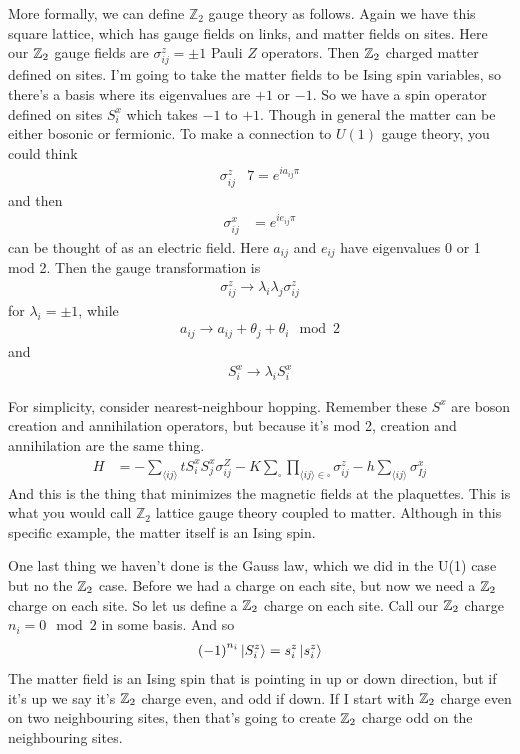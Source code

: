 More formally,
we can define $\mathbb{Z}_2$ gauge theory as follows.
Again we have this square lattice,
which has gauge fields on links,
and matter fields on sites.
Here our $\mathbb{Z}_2$ gauge fields are $\sigma_{ij}^z= \pm 1$ Pauli $Z$ operators.
Then $\mathbb{Z}_2$ charged matter defined on sites.
I'm going to take the matter fields to be Ising spin variables,
so there's a basis where its eigenvalues are $+1$ or $-1$.
So we have a spin operator defined on sites $S_{i}^{x}$
which takes $-1$ to $+1$.
Though in general the matter can be either bosonic or fermionic.
To make a connection to $U(1)$ gauge theory,
you could think
\begin{align}
    \sigma_{ij}^{z} &7=
    e^{ia_{ij}\pi}
\end{align}
and then
\begin{align}
    \sigma_{ij}^{x}
    &=
    e^{i e_{ij} \pi}
\end{align}
can be thought of as an electric field.
Here $a_{ij}$ and $e_{ij}$ have eigenvalues 0 or 1 mod 2.
Then the gauge transformation is
\begin{align}
    \sigma_{ij}^z \to \lambda_i \lambda_j \sigma_{ij}^z
\end{align}
for $\lambda_i = \pm 1$,
while
\begin{align}
    a_{ij} \to a_{ij} + \theta_j + \theta_i \mod 2
\end{align}
and 
\begin{align}
    S_i^x \to \lambda_i S_i^x
\end{align}

For simplicity,
consider nearest-neighbour hopping.
Remember these $S^x$ are boson creation and annihilation operators,
but because it's mod 2,
creation and annihilation are the same thing.
\begin{align}
    H &=
    -\sum_{\langle ij \rangle}
    t 
    S_i^x S_j^x \sigma_{ij}^Z
    - K
    \sum_{\square}
    \prod_{\langle ij\rangle \in \square}
    \sigma_{ij}^z
    - h
    \sum_{\langle ij \rangle}
    \sigma_{Ij}^x
\end{align}
And this is the thing that minimizes the magnetic fields at the plaquettes.
This is what you would call $\mathbb{Z}_2$ lattice gauge theory
coupled to matter.
Although in this specific example,
the matter itself is an Ising spin.

One last thing we haven't done is the Gauss law,
which we did in the U(1) case but no the $\mathbb{Z}_2$ case.
Before we had a charge on each site,
but now we need a $\mathbb{Z}_2$ charge on each site.
So let us define a $\mathbb{Z}_2$ charge on each site.
Call our $\mathbb{Z}_2$ charge $n_i = 0 \mod 2 $ in some basis.
And so
\begin{align}
    \left( -1 \right)^{n_i}
    \ket{S_i^z} = s_i^z \ket{s_i^z}
\end{align}
The matter field is an Ising spin that is pointing in up or down direction,
but if it's up we say it's $\mathbb{Z}_2$ charge even,
and odd if down.
If I start with $\mathbb{Z}_2$ charge even on two neighbouring sites,
then that's going to create $\mathbb{Z}_2$ charge odd on the neighbouring sites.

